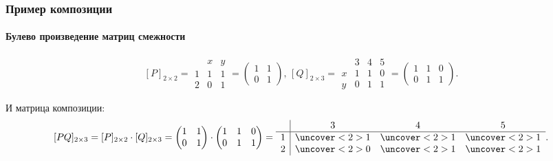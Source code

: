 \begin{frame}
    \frametitle{Пример композиции}
    \framesubtitle{Булево произведение матриц смежности}
    
	\[
		[P]_{2\times 2}=
		\begin{array}{c|cc}
			  & x & y \\ \hline
			1 & 1 & 1 \\
			2 & 0 & 1
		\end{array}=
		\begin{pmatrix}
			1&1\\
			0&1
		\end{pmatrix},\,
		[Q]_{2\times 3}=
		\begin{array}{c|ccc}
			  & 3 & 4 & 5 \\ \hline
			x & 1 & 1 & 0 \\
			y & 0 & 1 & 1 
		\end{array}=
		\begin{pmatrix}
			1&1&0 \\
			0&1&1 
		\end{pmatrix}.
	\]

	И матрица композиции:
	\[
		[PQ]_{2\times 3}=
		[P]_{2\times 2}\cdot [Q]_{2\times 3}=
		\begin{pmatrix}
			1&1\\
			0&1
		\end{pmatrix}\cdot
		\begin{pmatrix}
			1&1&0 \\
			0&1&1 
		\end{pmatrix}=
		\begin{array}{c|ccc}
			  &             3            & 4            & 5  \\ \hline
			1 & \uncover<2>{1}&\uncover<2>{1}&\uncover<2>{1} \\
			2 & \uncover<2>{0}&\uncover<2>{1}&\uncover<2>{1}
		\end{array}.
	\]
\end{frame}

